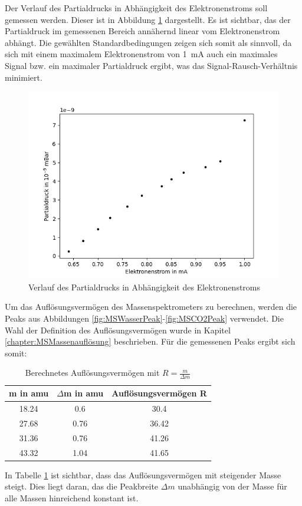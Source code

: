 Der Verlauf des Partialdrucks in Abhängigkeit des Elektronenstroms soll gemessen werden. Dieser ist in Abbildung \ref{fig:MSParDEI} dargestellt. Es ist sichtbar, das der Partialdruck im gemessenen Bereich annähernd linear vom Elektronenstrom abhängt. Die gewählten Standardbedingungen zeigen sich somit als sinnvoll, da sich mit einem maximalem Elektronenstrom von \SI{1}{mA} auch ein maximales Signal bzw. ein maximaler Partialdruck ergibt, was das Signal-Rausch-Verhältnis minimiert. 
\begin{figure}[H]
    \centering
    \includegraphics[width=140mm,scale=0.8]{Massenspektrometer/include/MSpardEI.png}
    \caption{Verlauf des Partialdrucks in Abhängigkeit des Elektronenstroms}
    \label{fig:MSParDEI}
\end{figure}

Um das Auflösungsvermögen des Massenspektrometers zu 
berechnen, werden die Peaks aus Abbildungen \ref{fig:MSWasserPeak}-\ref{fig:MSCO2Peak} verwendet. Die Wahl der Definition des Auflösungsvermögen wurde in Kapitel \ref{chapter:MSMassenauflösung} beschrieben. 
Für die gemessenen Peaks ergibt sich somit:

\begin{table}[H]
    \centering
    \caption{Berechnetes Auflösungsvermögen mit $R = \frac{m}{\Delta m}$}
    \begin{tabular}{ccc}
        m in amu & $\Delta$m in amu&  Auflösungsvermögen R\\ \hline
        18.24 & 0.6 &30.4\\
        27.68 & 0.76&36.42\\
        31.36 & 0.76&41.26\\
        43.32 & 1.04&41.65\\\hline
    \end{tabular}
    
    \label{tab:MSAuflösungsvermögen}
\end{table}
In Tabelle \ref{tab:MSAuflösungsvermögen} ist sichtbar, dass das Auflösungsvermögen mit steigender Masse steigt. Dies liegt daran, das die Peakbreite $\Delta m$ unabhängig von der Masse für alle Massen hinreichend konstant ist. 

